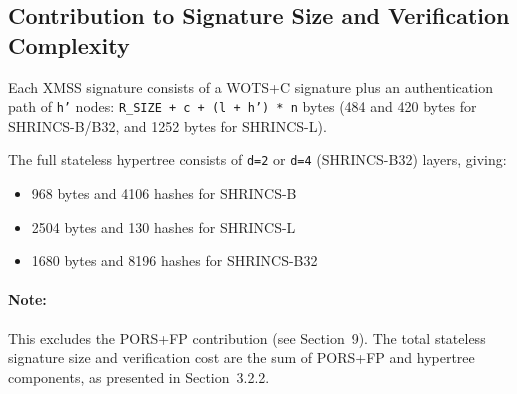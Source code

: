 \subsection{Contribution to Signature Size and Verification Complexity}
Each XMSS signature consists of a WOTS+C signature plus an authentication path of \texttt{h'} nodes: \texttt{R\_SIZE + c + (l + h') * n} bytes (484 and 420 bytes for SHRINCS-B/B32, and 1252 bytes for SHRINCS-L).

The full stateless hypertree consists of \texttt{d=2} or \texttt{d=4} (SHRINCS-B32)  layers, giving:
\begin{itemize}
    \item 968 bytes and 4106 hashes for SHRINCS-B
    \item 2504 bytes and 130 hashes for SHRINCS-L
    \item 1680 bytes and 8196 hashes for SHRINCS-B32
\end{itemize}

\paragraph{Note:} This excludes the PORS+FP contribution (see Section~9). The total stateless signature size and verification cost are the sum of PORS+FP and hypertree components, as presented in Section~3.2.2.
